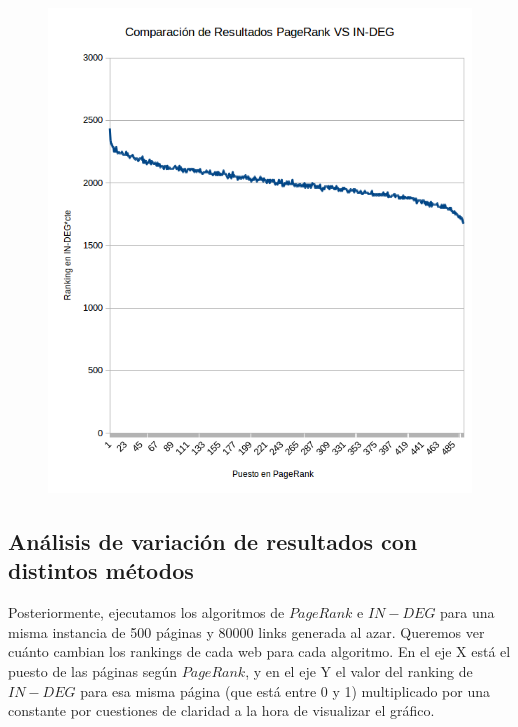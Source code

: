 \begin{figure}
  \vspace{-20pt}
  \begin{center}
    \includegraphics[scale= 0.6]{imagenes/pagerankVSindeg.png}
  \end{center}
  \vspace{-10pt}
  \vspace{-10pt}
\end{figure}

\subsection{Análisis de variación de resultados con distintos métodos}

Posteriormente, ejecutamos los algoritmos de $PageRank$ e $IN-DEG$ para una misma instancia de 500 páginas y 80000 links generada al azar. Queremos ver cuánto cambian los rankings de cada web para cada algoritmo. En el eje X está el puesto de las páginas según $PageRank$, y en el eje Y el valor del ranking de $IN-DEG$ para esa misma página (que está entre 0 y 1) multiplicado por una constante por cuestiones de claridad a la hora de visualizar el gráfico.\\


